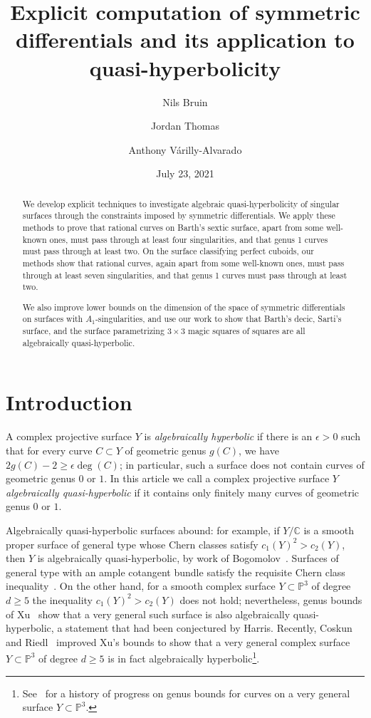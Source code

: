 \documentclass[12pt, reqno]{amsart}
\title[Symmetric differentials]{Explicit computation of symmetric differentials and its application to quasi-hyperbolicity}
\author{Nils Bruin}
\author{Jordan Thomas}
\author{Anthony V\'arilly-Alvarado}
\date{July 23, 2021}
\theoremstyle{definition}
\newcommand{\PP}{{\mathbb P}}
\newcommand{\C}{{\mathbb C}}
\numberwithin{equation}{section}
\numberwithin{table}{section}
\begin{document}
\begin{abstract}
We develop explicit techniques to investigate algebraic quasi-hyperbolicity of singular surfaces through the constraints imposed by symmetric differentials.  We apply these methods to prove that rational curves on Barth's sextic surface, apart from some well-known ones, must pass through at least four singularities, and that genus 1 curves must pass through at least two.  On the surface classifying perfect cuboids, our methods show that rational curves, again apart from some well-known ones, must pass through at least seven singularities, and that genus 1 curves must pass through at least two.

We also improve lower bounds on the dimension of the space of symmetric differentials on surfaces with $A_1$-singularities, and use our work to show that Barth's decic, Sarti's surface, and the surface parametrizing $3\times 3$ magic squares of squares are all algebraically quasi-hyperbolic.

\end{abstract}

\maketitle

\section{Introduction}

A complex projective surface $Y$ is \emph{algebraically hyperbolic} if there is an $\epsilon > 0$ such that for every curve $C\subset Y$ of geometric genus $g(C)$, we have $2g(C) - 2 \geq \epsilon\deg(C)$; in particular, such a surface does not contain curves of geometric genus $0$ or $1$.  In this article we call a complex projective surface $Y$ \emph{algebraically quasi-hyperbolic} if it contains only finitely many curves of geometric genus $0$ or $1$. 

Algebraically quasi-hyperbolic surfaces abound: for example, if $Y/\C$ is a smooth proper surface of general type whose Chern classes satisfy $c_1(Y)^2 > c_2(Y)$, then $Y$ is algebraically quasi-hyperbolic, by work of Bogomolov~\cite[Corollary~5]{Bogomolov}. Surfaces of general type with an ample cotangent bundle satisfy the requisite Chern class inequality~\cite{FultonLazarsfeld}. On the other hand, for a smooth complex surface $Y\subset \PP^3$ of degree $d \geq 5$ the inequality $c_1(Y)^2 > c_2(Y)$ does not hold; nevertheless, genus bounds of Xu~\cite{Xu} show that a very general such surface is also algebraically quasi-hyperbolic, a statement that had been conjectured by Harris.  Recently, Coskun and Riedl~\cite{CoskunRiedl} improved Xu's bounds to show that a very general complex surface $Y\subset \PP^3$ of degree $d \geq 5$ is in fact algebraically hyperbolic\footnote{See~\cite[Remark~3.4]{Demailly} for a history of progress on genus bounds for curves on a very general surface $Y\subset \PP^3$.}.
\end{document}
